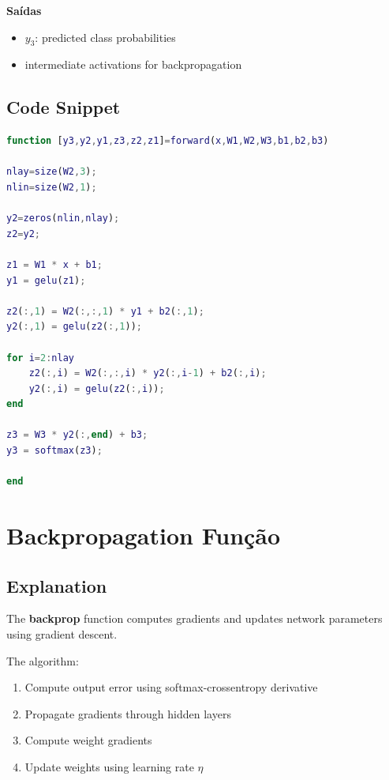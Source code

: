 \textbf{Saídas}

\begin{itemize}
\item \(y_3\): predicted class probabilities
\item intermediate activations for backpropagation
\end{itemize}

\subsection{Code Snippet}

\begin{lstlisting}[language=Matlab]
function [y3,y2,y1,z3,z2,z1]=forward(x,W1,W2,W3,b1,b2,b3)

nlay=size(W2,3);
nlin=size(W2,1);

y2=zeros(nlin,nlay);
z2=y2;

z1 = W1 * x + b1;
y1 = gelu(z1);

z2(:,1) = W2(:,:,1) * y1 + b2(:,1);
y2(:,1) = gelu(z2(:,1));

for i=2:nlay
    z2(:,i) = W2(:,:,i) * y2(:,i-1) + b2(:,i);
    y2(:,i) = gelu(z2(:,i));
end

z3 = W3 * y2(:,end) + b3;
y3 = softmax(z3);

end
\end{lstlisting}

\newpage

\section{Backpropagation Função}

\subsection{Explanation}

The \textbf{backprop} function computes gradients and updates network parameters using gradient descent.

The algorithm:

\begin{enumerate}
\item Compute output error using softmax-crossentropy derivative
\item Propagate gradients through hidden layers
\item Compute weight gradients
\item Update weights using learning rate \(\eta\)
\end{enumerate}

